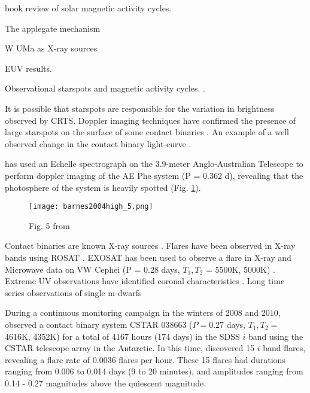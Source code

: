\documentclass[12pt]{article} %
\numberwithin{equation}{section} %
\begin{document}
\citep{balogh2015solar} book review of solar magnetic activity cycles.

The applegate mechanism \citep{applegate1992mechanism} \citep{lanza2006internal}

W UMa as X-ray sources \citep{stepien2001rosat}

\citep{rucinski1998extreme} EUV results.

Observational starspots and magnetic activity cycles.  \citep{borkovits2005indirect,qian2000possible,kaszas1998period,qian2007ad,lee2004period,yang2012deep,zhang2004long}.

It is possible that starspots are responsible for the variation in brightness observed by CRTS. Doppler imaging techniques have confirmed the presence of large starspots on the surface of some contact binaries \citep{barnes2004high}.  An example of a well observed change in the contact binary light-curve \citep{gazeas2006modeling}.

\citet{barnes2004high} has used an Echelle spectrograph on the 3.9-meter Anglo-Australian Telescope to perform doppler imaging of the AE Phe system (P = 0.362 d), revealing that the photosphere of the system is heavily spotted (Fig. \ref{fig: barnes2004high_5}).

\begin{figure}[H]
\centering
\texttt{[image: barnes2004high\_5.png]}
\caption{Fig. 5 from \citet{barnes2004high}}
\label{fig: barnes2004high_5}
\end{figure}

Contact binaries are known X-ray sources \citep{chen2006w}. Flares have been observed in X-ray bands using ROSAT \citep{mcgale1996rosat}.
EXOSAT has been used to observe a flare in X-ray and Microwave data on VW Cephei (P =  0.28 days, $T_{1}, T_{2}$ = 5500K, 5000K) \citep{vilhu1988simultaneous}. Extreme UV observations have identified coronal characteristics \citep{brickhouse1998extreme}. Long time series observations of single m-dwarfs  \citep{lacy1976uv}

During a continuous monitoring campaign in the winters of 2008 and 2010, \citet{qian2014optical} observed a contact binary system CSTAR 038663 ($P = 0.27$ days, $T_{1}, T_{2} =$ 4616K, 4352K) for a total of 4167 hours (174 days) in the SDSS $i$ band using the CSTAR telescope array in the Antarctic. In this time, \citet{qian2014optical} discovered 15 $i$ band flares, revealing a flare rate of $0.0036$ flares per hour. These 15 flares had durations ranging from 0.006 to 0.014 days (9 to 20 minutes), and amplitudes ranging from 0.14 - 0.27 magnitudes above the quiescent magnitude.
\end{document}
